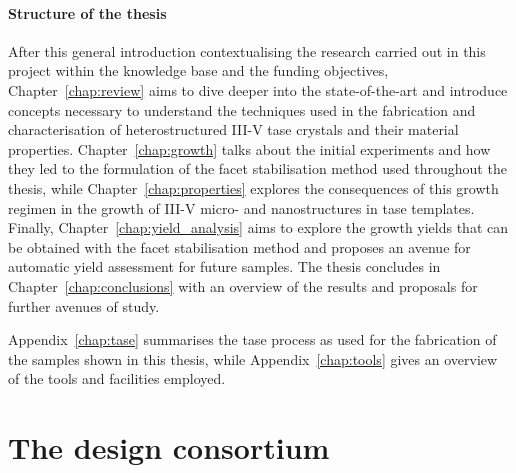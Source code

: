 \paragraph{Structure of the thesis} After this general introduction contextualising the research carried out in this project within the knowledge base and the funding objectives, Chapter~\ref{chap:review} aims to dive deeper into the state-of-the-art and introduce concepts necessary to understand the techniques used in the fabrication and characterisation of heterostructured III-V \acs{tase} crystals and their material properties. Chapter~\ref{chap:growth} talks about the initial experiments and how they led to the formulation of the facet stabilisation method used throughout the thesis, while Chapter~\ref{chap:properties} explores the consequences of this growth regimen in the growth of III-V micro- and nanostructures in \acs{tase} templates. Finally, Chapter~\ref{chap:yield_analysis} aims to explore the growth yields that can be obtained with the facet stabilisation method and proposes an avenue for automatic yield assessment for future samples. The thesis concludes in Chapter~\ref{chap:conclusions} with an overview of the results and proposals for further avenues of study. 

Appendix~\ref{chap:tase} summarises the \acs{tase} process as used for the fabrication of the samples shown in this thesis, while Appendix~\ref{chap:tools} gives an overview of the tools and facilities employed.
\par

\section{\texorpdfstring{The \acs{design} consortium}{The DESIGN-EID consortium}}

